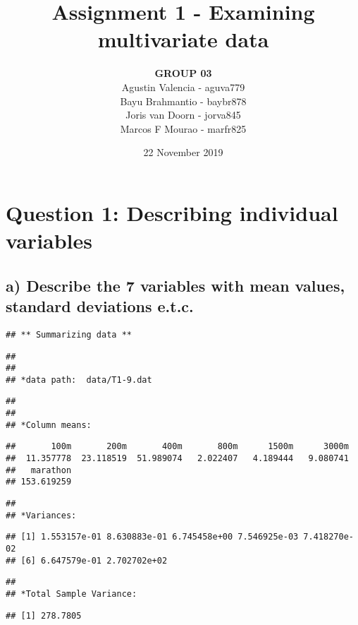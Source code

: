 \documentclass[]{article}
\title{Assignment 1 - Examining multivariate data}
\author{\textbf{GROUP 03}\\
Agustin Valencia - aguva779\\
Bayu Brahmantio - baybr878\\
Joris van Doorn - jorva845\\
Marcos F Mourao - marfr825}
\date{22 November 2019}
\begin{document}
\maketitle

\hypertarget{question-1-describing-individual-variables}{%
\section{Question 1: Describing individual
variables}\label{question-1-describing-individual-variables}}

\hypertarget{a-describe-the-7-variables-with-mean-values-standard-deviations-e.t.c.}{%
\subsection{a) Describe the 7 variables with mean values, standard
deviations
e.t.c.}\label{a-describe-the-7-variables-with-mean-values-standard-deviations-e.t.c.}}

\begin{verbatim}
## ** Summarizing data **
\end{verbatim}

\begin{verbatim}
## 
## 
## *data path:  data/T1-9.dat
\end{verbatim}

\begin{verbatim}
## 
## 
## *Column means:
\end{verbatim}

\begin{verbatim}
##       100m       200m       400m       800m      1500m      3000m 
##  11.357778  23.118519  51.989074   2.022407   4.189444   9.080741 
##   marathon 
## 153.619259
\end{verbatim}

\begin{verbatim}
## 
## *Variances:
\end{verbatim}

\begin{verbatim}
## [1] 1.553157e-01 8.630883e-01 6.745458e+00 7.546925e-03 7.418270e-02
## [6] 6.647579e-01 2.702702e+02
\end{verbatim}

\begin{verbatim}
## 
## *Total Sample Variance:
\end{verbatim}

\begin{verbatim}
## [1] 278.7805
\end{verbatim}
\end{document}
